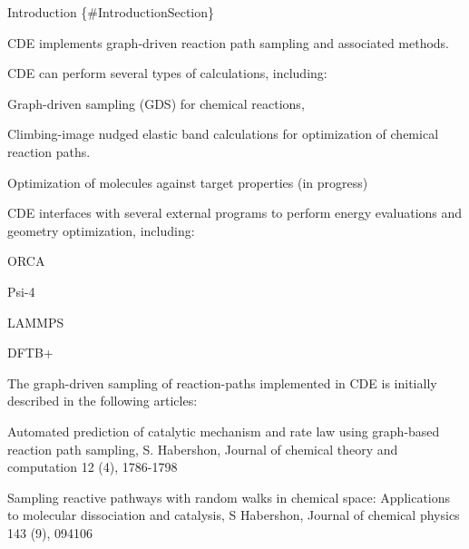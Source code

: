Introduction \{\#\+Introduction\+Section\}

C\+DE implements graph-\/driven reaction path sampling and associated methods.

C\+DE can perform several types of calculations, including\+:
\begin{DoxyItemize}
\item Graph-\/driven sampling (G\+DS) for chemical reactions,
\item Climbing-\/image nudged elastic band calculations for optimization of chemical reaction paths.
\item Optimization of molecules against target properties (in progress)
\end{DoxyItemize}

C\+DE interfaces with several external programs to perform energy evaluations and geometry optimization, including\+:
\begin{DoxyItemize}
\item O\+R\+CA
\item Psi-\/4
\item L\+A\+M\+M\+PS
\item D\+F\+T\+B+
\end{DoxyItemize}

The graph-\/driven sampling of reaction-\/paths implemented in C\+DE is initially described in the following articles\+:
\begin{DoxyItemize}
\item Automated prediction of catalytic mechanism and rate law using graph-\/based reaction path sampling, S. Habershon, Journal of chemical theory and computation 12 (4), 1786-\/1798
\end{DoxyItemize}

Sampling reactive pathways with random walks in chemical space\+: Applications to molecular dissociation and catalysis, S Habershon, Journal of chemical physics 143 (9), 094106 